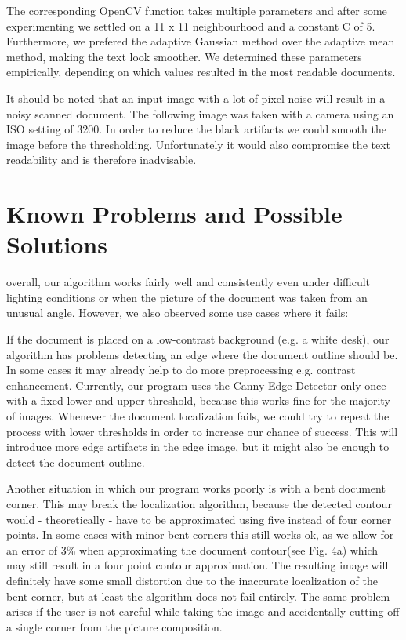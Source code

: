 \documentclass[bibliography=totoc]{scrartcl}
\begin{document}
	The corresponding OpenCV function takes multiple parameters and after some experimenting we settled on a 11 x 11 neighbourhood and a constant C of 5. 
	Furthermore, we prefered the adaptive Gaussian method over the adaptive mean method, making the text look smoother.
	We determined these parameters empirically, depending on which values resulted in the most readable documents.

	It should be noted that an input image with a lot of pixel noise will result in a noisy scanned document. 
	The following image was taken with a camera using an ISO setting of 3200.
	In order to reduce the black artifacts we could smooth the image before the thresholding. 
	Unfortunately it would also compromise the text readability and is therefore inadvisable. 

	\section{Known Problems and Possible Solutions}
	overall, our algorithm works fairly well and consistently even under difficult lighting conditions or when the picture of the document was taken from an unusual angle.
	However, we also observed some use cases where it fails:
	
	If the document is placed on a low-contrast background (e.g. a white desk), our algorithm has problems detecting an edge where the document outline should be.
	In some cases it may already help to do more preprocessing e.g. contrast enhancement.
	Currently, our program uses the Canny Edge Detector only once with a fixed lower and upper threshold, because this works fine for the majority of images.
	Whenever the document localization fails, we could try to repeat the process with lower thresholds in order to increase our chance of success. 
	This will introduce more edge artifacts in the edge image, but it might also be enough to detect the document outline.

	Another situation in which our program works poorly is with a bent document corner. 
	This may break the localization algorithm, because the detected contour would - theoretically - have to be approximated using five instead of four corner points.
	In some cases with minor bent corners this still works ok, as we allow for an error of 3\% when approximating the document contour(see Fig. 4a) which may still result in a four point contour approximation. 
	The resulting image will definitely have some small distortion due to the inaccurate localization of the bent corner, but at least the algorithm does not fail entirely.
	The same problem arises if the user is not careful while taking the image and accidentally cutting off a single corner from the picture composition.
	
\end{document}
